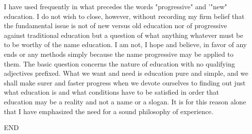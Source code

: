 I have used frequently in what precedes the words "progressive" and '"new" education. 
I do not wish to close, however, without recording my firm belief that the fundamental 
issue is not of new versus old education nor of progressive against traditional education 
but a question of what anything whatever must be to be worthy of the name education. I 
am not, I hope and believe, in favor of any ends or any methods simply because the name 
progressive may be applied to them. The basic question concerns the nature of education 
with no qualifying adjectives prefixed. What we want and need is education pure and 
simple, and we shall make surer and faster progress when we devote ourselves to finding 
out just what education is and what conditions have to be satisfied in order that education 
may be a reality and not a name or a slogan. It is for this reason alone that I have 
emphasized the need for a sound philosophy of experience. 


END 

